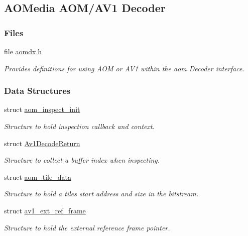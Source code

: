 \hypertarget{group__aom__decoder}{}\subsection{A\+O\+Media A\+O\+M/\+A\+V1 Decoder}
\label{group__aom__decoder}
\subsubsection*{Files}
\begin{DoxyCompactItemize}
\item 
file \hyperlink{aomdx_8h}{aomdx.\+h}
\begin{DoxyCompactList}\small\item\em Provides definitions for using A\+OM or A\+V1 within the aom Decoder interface. \end{DoxyCompactList}\end{DoxyCompactItemize}
\subsubsection*{Data Structures}
\begin{DoxyCompactItemize}
\item 
struct \hyperlink{structaom__inspect__init}{aom\+\_\+inspect\+\_\+init}
\begin{DoxyCompactList}\small\item\em Structure to hold inspection callback and context. \end{DoxyCompactList}\item 
struct \hyperlink{structAv1DecodeReturn}{Av1\+Decode\+Return}
\begin{DoxyCompactList}\small\item\em Structure to collect a buffer index when inspecting. \end{DoxyCompactList}\item 
struct \hyperlink{structaom__tile__data}{aom\+\_\+tile\+\_\+data}
\begin{DoxyCompactList}\small\item\em Structure to hold a tile\textquotesingle{}s start address and size in the bitstream. \end{DoxyCompactList}\item 
struct \hyperlink{structav1__ext__ref__frame}{av1\+\_\+ext\+\_\+ref\+\_\+frame}
\begin{DoxyCompactList}\small\item\em Structure to hold the external reference frame pointer. \end{DoxyCompactList}\end{DoxyCompactItemize}
